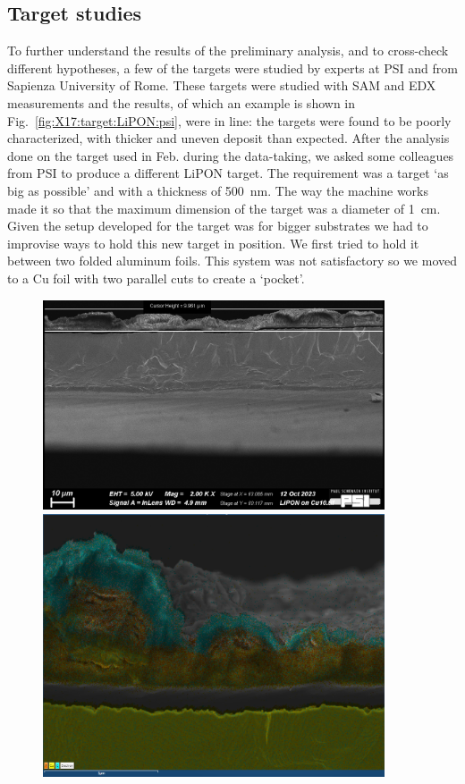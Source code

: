 \begin{refsection}
    \section{Target studies}
    \label{sec:X17:targets}
        To further understand the results of the preliminary analysis, and to cross-check different hypotheses, a few of the targets were studied by experts at PSI and from Sapienza University of Rome.
        These targets were studied with SAM and EDX measurements and the results, of which an example is shown in Fig.~\ref{fig:X17:target:LiPON:psi}, were in line: the targets were found to be poorly characterized, with thicker and uneven deposit than expected.
        After the analysis done on the target used in Feb. during the data-taking, we asked some colleagues from PSI to produce a different LiPON target.
        The requirement was a target `as big as possible' and with a thickness of \SI{500}{\nano m}.
        The way the machine works made it so that the maximum dimension of the target was a diameter of \SI{1}{cm}.
        Given the setup developed for the target was for bigger substrates we had to improvise ways to hold this new target in position.
        We first tried to hold it between two folded aluminum foils. 
        This system was not satisfactory so we moved to a Cu foil with two parallel cuts to create a `pocket'.
        \begin{figure}
            \centering
            \includegraphics[width = 0.9\textwidth]{Figures/X17/PSI_LiPON_picture.png}
            \includegraphics[width = 0.9\textwidth]{Figures/X17/PSI_LiPON-atoms_picture.PNG}

\end{figure}
\end{refsection}
